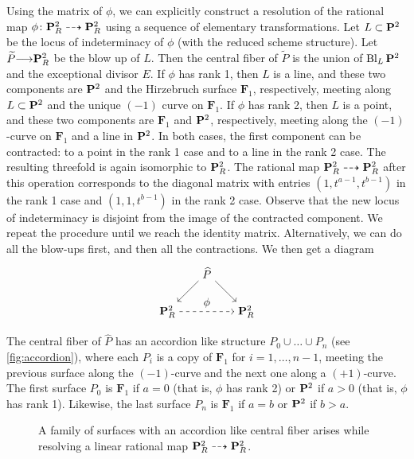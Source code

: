 \documentclass[12pt,reqno]{amsart}
\DeclareMathOperator{\Bl}{Bl}
\renewcommand{\to}{{\longrightarrow}}
\numberwithin{equation}{section}
\newcommand{\F}{\mathbf F}
\begin{document}
Using the matrix of $\phi$, we can explicitly construct a resolution of the rational map $\phi \colon \P^2_R \dashrightarrow \P^2_R$ using a sequence of elementary transformations.
Let $L \subset \P^2$ be the locus of indeterminacy of $\phi$ (with the reduced scheme structure).
Let $\widetilde P \to \P^2_R$ be the blow up of $L$.
Then the central fiber of $\widetilde P$ is the union of $\Bl_L\P^2$ and the exceptional divisor $E$.
If $\phi$ has rank 1, then $L$ is a line, and these two components are $\P^2$ and the Hirzebruch surface $\F_1$, respectively, meeting along $L \subset \P^2$ and the unique $(-1)$ curve on $\F_1$.
If $\phi$ has rank 2, then $L$ is a point, and these two components are $\F_1$ and $\P^2$, respectively, meeting along the $(-1)$-curve on $\F_1$ and a line in $\P^2$.
In both cases, the first component can be contracted: to a point in the rank 1 case and to a line in the rank 2 case.
The resulting threefold is again isomorphic to $\P^2_R$.
The rational map $\P^2_R \dashrightarrow \P^2_R$ after this operation corresponds to the diagonal matrix with entries $(1,t^{a-1}, t^{b-1})$ in the rank 1 case and $(1, 1, t^{b-1})$ in the rank 2 case.
Observe that the new locus of indeterminacy is disjoint from the image of the contracted component.
We repeat the procedure until we reach the identity matrix.
Alternatively, we can do all the blow-ups first, and then all the contractions.
We then get a diagram
\[
\begin{tikzpicture}[node distance=5em]
  \node (t) {$\widehat P$};
  \node (l) [below left of=t] {$\P^2_R$};
  \node (r) [below right of=t] {$\P^2_R$};
  \path [->] (l) edge[dashed]  node[above] {$\phi$}  (r) (t) edge (l) (t) edge (r);
\end{tikzpicture}
\]
The central fiber of $\widehat P$ has an accordion like structure $P_0 \cup \dots \cup P_n$ (see \autoref{fig:accordion}), where each $P_i$ is a copy of $\F_1$ for $i = 1, \dots, n-1$, meeting the previous surface along the $(-1)$-curve and the next one along a $(+1)$-curve.
The first surface $P_0$ is $\F_1$ if $a = 0$ (that is, $\phi$ has rank 2) or $\P^2$ if $a > 0$ (that is, $\phi$ has rank 1).
Likewise, the last surface $P_n$ is $\F_1$ if $a = b$ or $\P^2$ if $b > a$.

\begin{figure}
  \centering
  
  \caption{A family of surfaces with an accordion like central fiber arises while resolving a linear rational map $\P^2_R \dashrightarrow \P^2_R$.}
  \label{fig:accordion}
\end{figure}
\end{document}
